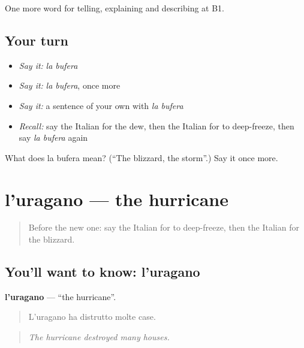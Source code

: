 \begin{grammarlens}[title={What you've built}]
One more word for telling, explaining and describing at B1.
\end{grammarlens}

\subsection*{Your turn}
\begin{itemize}
\raggedright
  \item \emph{Say it:} \emph{la bufera}
  \item \emph{Say it:} \emph{la bufera}, once more
  \item \emph{Say it:} a sentence of your own with \emph{la bufera}
  \item \emph{Recall:} say the Italian for the dew, then the Italian for to deep-freeze, then say \emph{la bufera} again
\end{itemize}

\begin{tcolorbox}[breakable,colback=teal!4,colframe=teal!35!black,title={Before you move on}]
What does la bufera mean? (\textquotedblleft{}The blizzard, the storm\textquotedblright{}.) Say it once more.
\end{tcolorbox}
\section[l'uragano]{l'uragano — the hurricane}

\label{lesson:IT-C469-uragano}



\begin{quote}
Before the new one: say the Italian for to deep-freeze, then the Italian for the blizzard.
\end{quote}

\subsection*{You'll want to know: l'uragano}
\textbf{l'uragano} — \textquotedblleft{}the hurricane\textquotedblright{}.

\begin{quote}
L'uragano ha distrutto molte case.
\end{quote}

\begin{quote}
\emph{The hurricane destroyed many houses.}
\end{quote}

